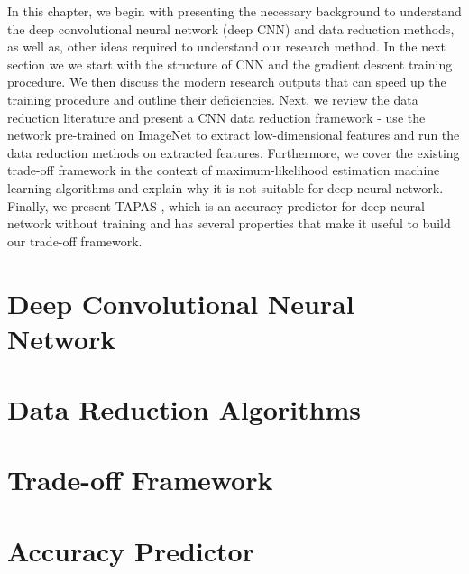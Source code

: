 In this chapter, we begin with presenting the necessary background to understand the deep convolutional neural network (deep CNN) and data reduction methods, as well as, other ideas required to understand our research method.  In the next section we we start with the structure of CNN and the gradient descent training procedure. We then discuss the modern research outputs that can speed up the training procedure and outline their deficiencies. Next, we review the data reduction literature and present a CNN data reduction framework - use the network pre-trained on ImageNet to extract low-dimensional features and run the data reduction methods on extracted features. Furthermore, we cover the existing trade-off framework in the context of maximum-likelihood estimation machine learning algorithms and explain why it is not suitable for deep neural network. Finally, we present TAPAS \cite{Istrate2019}, which is an accuracy predictor for deep neural network without training and has several properties that make it useful to build our trade-off framework.

\section{Deep Convolutional Neural Network}

\section{Data Reduction Algorithms}

\section{Trade-off Framework}

\section{Accuracy Predictor}